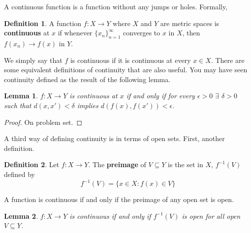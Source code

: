 \documentclass[12pt,reqno]{amsart}
\newtheorem{lemma}{Lemma}[section]
\theoremstyle{definition}
\newtheorem{definition}{Definition}[section]
\newcommand{\seq}[1]{\{{#1}_n \}_{n=1}^\infty }
\renewcommand{\to}{{\rightarrow}}
\begin{document}
A continuous function is a function without any jumps or
holes. Formally,
\begin{definition}
  A function $f:X \to Y$ where $X$ and $Y$ are metric spaces is
  \textbf{continuous} at $x$ if whenever $\seq{x}$ converges to $x$ in
  $X$, then $f(x_n) \to f(x)$ in $Y$.  
\end{definition}
We simply say that $f$ is continuous if it is continuous at every $x
\in X$.  There are some equivalent definitions of continuity that are
also useful. You may have seen continuity defined as the result of the
following lemma.
\begin{lemma}\label{lem:ced}
  $f: X \to Y$ is continuous at $x$ if and only if for every
  $\epsilon>0$ $\exists$ $\delta >0$ such that $d(x,x') < \delta $
  implies $d(f(x),f(x')) < \epsilon$.
\end{lemma}
\begin{proof}
  On problem set.

\end{proof}
A third way of defining continuity is in terms of open sets. First,
another definition.
\begin{definition}
  Let $f: X \to Y$. The \textbf{preimage} of $V \subseteq Y$ is the
  set in $X$, $f^{-1}(V)$ defined by
  \[ f^{-1} (V) = \{ x \in X: f(x) \in V \} \]
\end{definition}
A function is continuous if and only if the preimage of any open set
is open. 
\begin{lemma}\label{lem:copen}
  $f:X \to Y$ is continuous if and only if $f^{-1}(V)$ is open for all
  open $V \subseteq Y$. 
\end{lemma}
\end{document}
